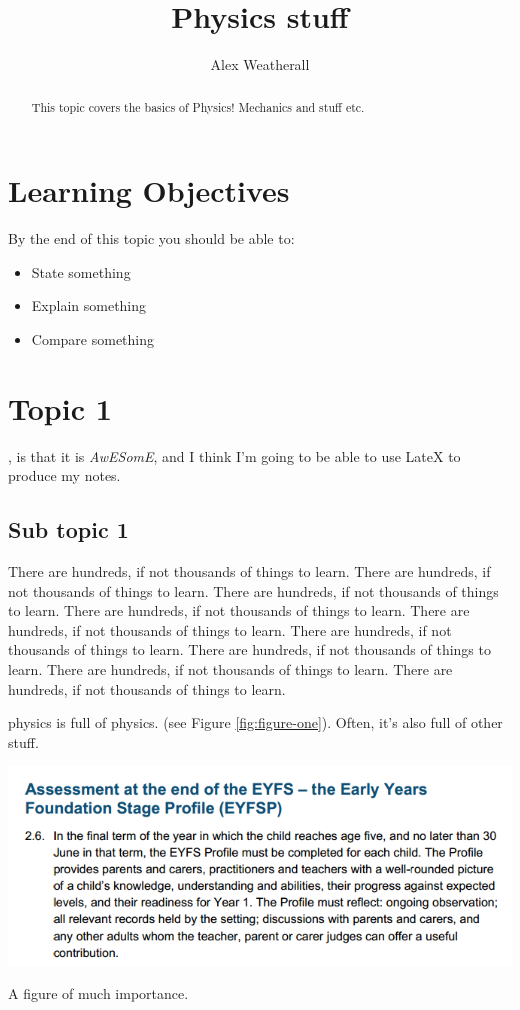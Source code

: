 \documentclass{tufte-handout}
\title{Physics stuff}
\author{Alex Weatherall}
\begin{document}
\maketitle%

\begin{abstract}
\noindent This topic covers the basics of Physics! Mechanics and stuff etc.
\end{abstract}

\section{Learning Objectives}
By the end of this topic you should be able to:
\begin{itemize}
\item State something
\item Explain something
\item Compare something
\end{itemize}

\pagebreak

\section{Topic 1}

, is that it is \textit{AwESomE}, and I think I'm going to be able to use LateX to produce my notes.

\subsection{Sub topic 1}

There are hundreds, if not thousands of things to learn. There are hundreds, if not thousands of things to learn. There are hundreds, if not thousands of things to learn. There are hundreds, if not thousands of things to learn. There are hundreds, if not thousands of things to learn. There are hundreds, if not thousands of things to learn. There are hundreds, if not thousands of things to learn. There are hundreds, if not thousands of things to learn. There are hundreds, if not thousands of things to learn.  

 physics is full of physics. (see Figure \ref{fig:figure-one}).  Often, it's also full of other stuff.

\begin{marginfigure}[0in]
  \includegraphics{figures/testimage}
  \caption{A figure of much importance.}
    \label{fig:figure-one}
\end{marginfigure}
\end{document}
